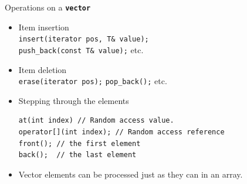 \documentclass[14pt,aspectratio=1610]{beamer}
\begin{document}
\begin{frame}[fragile]{Operations on a \texttt{\bfseries vector}}
  \small
  \begin{itemize}
  \item
    Item insertion\\
    \lstinline{insert(iterator pos, T& value);}\\\lstinline{push_back(const T& value);} etc.
  \item
    Item deletion\\
    \lstinline{erase(iterator pos);} \lstinline{pop_back();} etc.
  \item
    Stepping through the elements
    \begin{lstlisting}
at(int index) // Random access value.
operator[](int index); // Random access reference
front(); // the first element
back();  // the last element
\end{lstlisting}
\item
  Vector elements can be processed just as they can in an array.
\end{itemize}
\end{frame}
\end{document}
